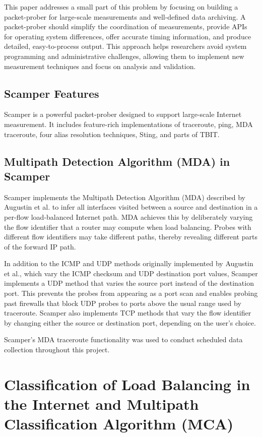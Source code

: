 \documentclass[12pt]{cwru_thesis}
\begin{document}
This paper addresses a small part of this problem by focusing on building a packet-prober for large-scale measurements and well-defined data archiving. A packet-prober should simplify the coordination of measurements, provide APIs for operating system differences, offer accurate timing information, and produce detailed, easy-to-process output. This approach helps researchers avoid system programming and administrative challenges, allowing them to implement new measurement techniques and focus on analysis and validation.

\subsection{Scamper Features}

Scamper is a powerful packet-prober designed to support large-scale Internet measurement. It includes feature-rich implementations of traceroute, ping, MDA traceroute, four alias resolution techniques, Sting, and parts of TBIT.

\subsection{Multipath Detection Algorithm (MDA) in Scamper}

Scamper implements the Multipath Detection Algorithm (MDA) described by Augustin et al. to infer all interfaces visited between a source and destination in a per-flow load-balanced Internet path. MDA achieves this by deliberately varying the flow identifier that a router may compute when load balancing. Probes with different flow identifiers may take different paths, thereby revealing different parts of the forward IP path.

In addition to the ICMP and UDP methods originally implemented by Augustin et al., which vary the ICMP checksum and UDP destination port values, Scamper implements a UDP method that varies the source port instead of the destination port. This prevents the probes from appearing as a port scan and enables probing past firewalls that block UDP probes to ports above the usual range used by traceroute. Scamper also implements TCP methods that vary the flow identifier by changing either the source or destination port, depending on the user’s choice.

Scamper's MDA traceroute functionality was used to conduct scheduled data collection throughout this project.

\section{Classification of Load Balancing in the Internet and Multipath Classification Algorithm (MCA)}
\end{document}
